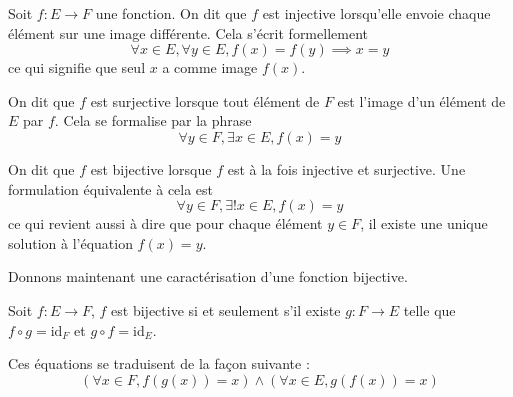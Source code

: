 \begin{defi}
    Soit $f : E \to F$ une fonction. On dit que $f$ est injective lorsqu'elle envoie chaque élément sur une image différente. Cela s'écrit formellement $$\forall x\in E, \forall y \in E, f(x)=f(y)\implies x=y$$
    ce qui signifie que seul $x$ a comme image $f(x)$.
    
    On dit que $f$ est surjective lorsque tout élément de $F$ est l'image d'un élément de $E$ par $f$. Cela se formalise par la phrase $$\forall y\in F, \exists x\in E, f(x)=y$$
    
    On dit que $f$ est bijective lorsque $f$ est à la fois injective et surjective. Une formulation équivalente à cela est $$\forall y\in F,\exists ! x\in E, f(x)=y$$ ce qui revient aussi à dire que pour chaque élément $y\in F$, il existe une unique solution à l'équation $f(x)=y$.
\end{defi}

Donnons maintenant une caractérisation d'une fonction bijective.

\begin{them}
    Soit $f : E \to F$, $f$ est bijective si et seulement s'il existe $g : F\to E$ telle que $f\circ g = \mathrm{id}_F$ et $g\circ f = \mathrm{id}_E$.
\end{them}

\begin{rmk}
    Ces équations se traduisent de la façon suivante :
    $$(\forall x\in F, f(g(x))=x)\land (\forall x\in E, g(f(x))=x)$$
\end{rmk}

